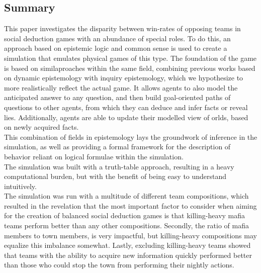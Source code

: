 \onecolumn
\begin{center}
	\section*{Summary}\label{sec:summary}
\end{center}
This paper investigates the disparity between win-rates of opposing teams in
social deduction games with an abundance of special roles. To do  this, an
approach based on epistemic logic and common sense is used to create a
simulation that emulates physical games of this type. The foundation of the
game is based on similaproaches within the same field, combining previous works based on dynamic epistemology with inquiry epistemology,
which we hypothesize to more realistically reflect the actual game. It allows agents to also model the anticipated answer to any question, and then build goal-oriented
paths of questions to other agents, from which they can deduce and infer facts or reveal lies. Additionally, agents are able to update their modelled view of orlds, based on newly acquired facts. \\
This combination of fields in epistemology lays the groundwork of inference in the simulation, 
as well as providing a formal framework for the description of behavior 
reliant on logical formulae within the simulation. \\
The simulation was built with a truth-table approach, resulting in a heavy
computational burden, but with the benefit of being easy to understand
intuitively. \\
The simulation was run with a multitude of different team compositions, which
resulted in the revelation that the most important factor to consider when
aiming for the creation of balanced social deduction games is that killing-heavy mafia teams perform better than any other compositions. Secondly, the ratio of mafia members to town members, is very impactful, but killing-heavy compositions may equalize this imbalance somewhat. Lastly, excluding killing-heavy teams showed that teams with the ability to acquire new information quickly performed better than those who could stop the town from performing their nightly actions. 
\twocolumn